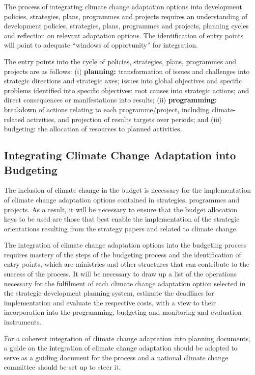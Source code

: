 \documentclass[
]{book}
\begin{document}
The process of integrating climate change adaptation options into development policies, strategies, plans, programmes and projects requires an understanding of development policies, strategies, plans, programmes and projects, planning cycles and reflection on relevant adaptation options. The identification of entry points will point to adequate ``windows of opportunity'' for integration.

The entry points into the cycle of policies, strategies, plans, programmes and projects are as follows: (i) \textbf{planning:} transformation of issues and challenges into strategic directions and strategic axes; issues into global objectives and specific problems identified into specific objectives; root causes into strategic actions; and direct consequences or manifestations into results; (ii) \textbf{programming:} breakdown of actions relating to each programme/project, including climate-related activities, and projection of results targets over periods; and (iii) budgeting: the allocation of resources to planned activities.

\subsection{Integrating Climate Change Adaptation into Budgeting}\label{integrating-climate-change-adaptation-into-budgeting}

The inclusion of climate change in the budget is necessary for the implementation of climate change adaptation options contained in strategies, programmes and projects. As a result, it will be necessary to ensure that the budget allocation keys to be used are those that best enable the implementation of the strategic orientations resulting from the strategy papers and related to climate change.

The integration of climate change adaptation options into the budgeting process requires mastery of the steps of the budgeting process and the identification of entry points, which are ministries and other structures that can contribute to the success of the process. It will be necessary to draw up a list of the operations necessary for the fulfilment of each climate change adaptation option selected in the strategic development planning system, estimate the deadlines for implementation and evaluate the respective costs, with a view to their incorporation into the programming, budgeting and monitoring and evaluation instruments.

For a coherent integration of climate change adaptation into planning documents, a guide on the integration of climate change adaptation should be adopted to serve as a guiding document for the process and a national climate change committee should be set up to steer it.
\end{document}

